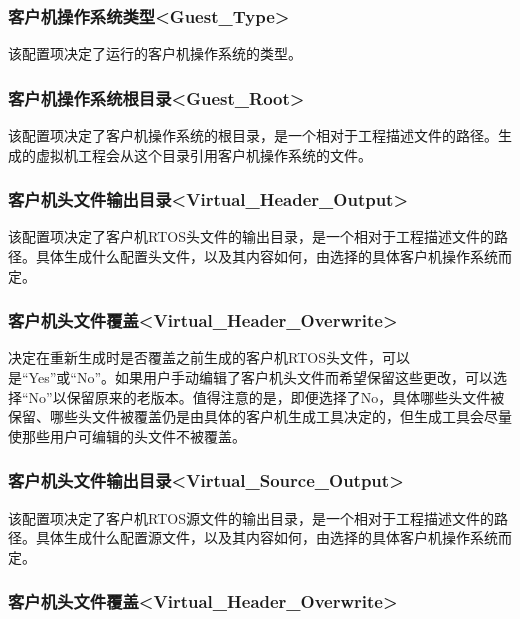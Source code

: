 \subsubsection{客户机操作系统类型<Guest\_Type>{}}\label{subsubsec:5-3-15-8}

该配置项决定了运行的客户机操作系统的类型。

\subsubsection{客户机操作系统根目录<Guest\_Root>{}}\label{subsubsec:5-3-15-9}

该配置项决定了客户机操作系统的根目录，是一个相对于工程描述文件的路径。生成的虚拟机工程会从这个目录引用客户机操作系统的文件。

\subsubsection{客户机头文件输出目录<Virtual\_Header\_Output>{}}\label{subsubsec:5-3-15-10}

该配置项决定了客户机RTOS头文件的输出目录，是一个相对于工程描述文件的路径。具体生成什么配置头文件，以及其内容如何，由选择的具体客户机操作系统而定。

\subsubsection{客户机头文件覆盖<Virtual\_Header\_Overwrite>{}}\label{subsubsec:5-3-15-11}

决定在重新生成时是否覆盖之前生成的客户机RTOS头文件，可以是``Yes''或``No''。如果用户手动编辑了客户机头文件而希望保留这些更改，可以选择``No''以保留原来的老版本。值得注意的是，即便选择了No，具体哪些头文件被保留、哪些头文件被覆盖仍是由具体的客户机生成工具决定的，但生成工具会尽量使那些用户可编辑的头文件不被覆盖。

\subsubsection{客户机头文件输出目录<Virtual\_Source\_Output>{}}\label{subsubsec:5-3-15-12}

该配置项决定了客户机RTOS源文件的输出目录，是一个相对于工程描述文件的路径。具体生成什么配置源文件，以及其内容如何，由选择的具体客户机操作系统而定。

\subsubsection{客户机头文件覆盖<Virtual\_Header\_Overwrite>{}}\label{subsubsec:5-3-15-13}

